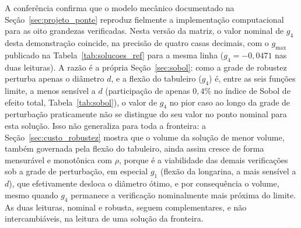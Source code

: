 \begin{appendices}
A conferência confirma que o modelo mecânico documentado na Seção~\ref{sec:projeto_ponte} reproduz fielmente a implementação computacional para as oito grandezas verificadas.
Nesta versão da matriz, o valor nominal de $g_4$ desta demonstração coincide, na precisão de quatro casas decimais, com o $g_{\max}$ publicado na Tabela~\ref{tab:solucoes_ref} para a mesma linha ($g_4 = -0{,}0471$ nas duas leituras).
A razão é a própria Seção~\ref{sec:sobol}: como a grade de robustez perturba apenas o diâmetro $d$, e a flexão do tabuleiro ($g_4$) é, entre as seis funções limite, a menos sensível a $d$ (participação de apenas $0{,}4\%$ no índice de Sobol de efeito total, Tabela~\ref{tab:sobol}), o valor de $g_4$ no pior caso ao longo da grade de perturbação praticamente não se distingue do seu valor no ponto nominal para esta solução.
Isso não generaliza para toda a fronteira: a Seção~\ref{sec:custo_robustez} mostra que o volume da solução de menor volume, também governada pela flexão do tabuleiro, ainda assim cresce de forma mensurável e monotônica com $\rho$, porque é a viabilidade das demais verificações sob a grade de perturbação, em especial $g_1$ (flexão da longarina, a mais sensível a $d$), que efetivamente desloca o diâmetro ótimo, e por consequência o volume, mesmo quando $g_4$ permanece a verificação nominalmente mais próxima do limite.
As duas leituras, nominal e robusta, seguem complementares, e não intercambiáveis, na leitura de uma solução da fronteira.

\end{appendices}
